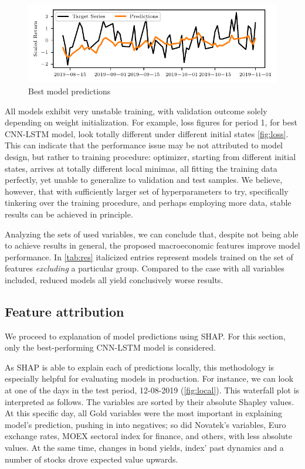 \documentclass[review, authoryear]{elsarticle}
\begin{document}
\begin{figure}
	\centering
	\includegraphics{preds.pdf}
	\caption{Best model predictions}
	\label{fig:preds}
\end{figure}

All models exhibit very unstable training, with validation outcome solely depending on weight initialization. For example, loss figures for period 1, for best CNN-LSTM model, look totally different under different initial states \autoref{fig:loss}. This can indicate that the performance issue may be not attributed to model design, but rather to training procedure: optimizer, starting from different initial states, arrives at totally different local minimas, all fitting the training data perfectly, yet unable to generalize to validation and test samples. We believe, however, that with sufficiently larger set of hyperparameters to try, specifically tinkering over the training procedure, and perhaps employing more data, stable results can be achieved in principle.

Analyzing the sets of used variables, we can conclude that, despite not being able to achieve results in general, the proposed macroeconomic features improve model performance. In \autoref{tab:res} italicized entries represent models trained on the set of features \textit{excluding} a particular group. Compared to the case with all variables included, reduced models all yield conclusively worse results.

\subsection{Feature attribution}

\noindent We proceed to explanation of model predictions using SHAP. For this section, only the best-performing CNN-LSTM model is considered.

As SHAP is able to explain each of predictions locally, this methodology is especially helpful for evaluating models in production. For instance, we can look at one of the days in the test period, 12-08-2019 (\autoref{fig:local}). This waterfall plot is interpreted as follows. The variables are sorted by their absolute Shapley values. At this specific day, all Gold variables were the most important in explaining model's prediction, pushing in into negatives; so did Novatek's variables, Euro exchange rates, MOEX sectoral index for finance, and others, with less absolute values. At the same time, changes in bond yields, index' past dynamics and a number of stocks drove expected value upwards.
\end{document}
